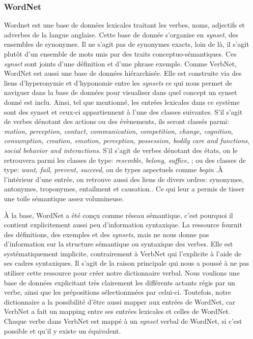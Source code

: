 \subsubsection{WordNet}
Wordnet est une base de données lexicales traitant les verbes, noms, adjectifs et adverbes de la langue anglaise. Cette base de donnée s'organise en \emph{synset}, des ensembles de synonymes. Il ne s'agit pas de synonymes exacts, loin de là, il s'agit plutôt d'un ensemble de mots unis par des traits conceptuo-sémantiques. Ces \emph{synset} sont joints d'une définition et d'une phrase exemple. Comme VerbNet, WordNet est aussi une base de données hiérarchisée. Elle est construite via des liens d'hyperonymie et d'hyponomie entre les \emph{synsets} ce qui nous permet de naviguer dans la base de données pour visualiser dans quel concept un synset donné est inclu. Ainsi, tel que mentionné, les entrées lexicales dans ce système sont des synset et ceux-ci appartiennent à l'une des classes suivantes. S'il s'agit de verbes dénotant des actions ou des évènements, ils seront classés parmi: \emph{ motion, perception, contact, communication, competition, change, cognition, consumption, creation, emotion, perception, possession, bodily care and functions, social behavior and interactions}. S'il s'agit de verbes dénotant des états, on le retrouvera parmi les classes de type: \emph{resemble, belong, suffice,} ;  ou des classes de type: \emph{want, fail, prevent, succeed}, ou de types aspectuels comme \emph{begin} \citep{Fellbaum1998}.À l'intérieur d'une entrée, on retrouve aussi des liens de divers ordres: synonymes, antonymes, troponymes, entailment et causation.\citep{SchulerVerbnetBroadcoverageComprehensive2005}. Ce qui leur a permis de tisser une toile sémantique assez volumineuse.

À la base, WordNet a été conçu comme réseau sémantique, c'est pourquoi il contient explicitement aussi peu d'information syntaxique. La ressource fournit des définitions, des exemples et des \emph{synsets}, mais ne nous donne pas d'information sur la structure sémantique ou syntaxique des verbes. Elle est systématiquement implicite, contrairement à VerbNet qui l'explicite à l'aide de ses cadres syntaxiques. Il s'agit de la raison principale qui nous a poussé à ne pas utiliser cette ressource pour créer notre dictionnaire verbal. Nous voulions une base de données explicitant très clairement les différents actants régis par un verbe, ainsi que les prépositions sélectionnnées par celui-ci. Toutefois, notre dictionnaire a la possibilité d'être aussi mapper aux entrées de WordNet, car VerbNet a fait un mapping entre ses entrées lexicales et celles de WordNet. Chaque verbe dans VerbNet est mappé à un \emph{synset} verbal de WordNet, si c'est possible et qu'il y existe un équivalent\citep{SchulerVerbnetBroadcoverageComprehensive2005}.

